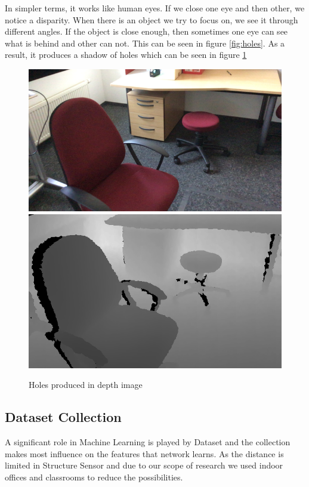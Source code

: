 In simpler terms, it works like human eyes. If we close one eye and then other, we notice a disparity. When there is an object we try to focus on, we see it through different angles. If the object is close enough, then sometimes one eye can see what is behind and other can not. This can be seen in figure \ref{fig:holes}. As a result, it produces a shadow of holes which can be seen in figure \ref{fig:holes2}\\

\begin{figure}[b]
    \includegraphics[scale=0.29]{Figures/RGB.png} \includegraphics[scale=0.37]{Figures/Depth.png}
    \caption{Holes produced in depth image}
    \label{fig:holes2}
\end{figure}


\subsection{Dataset Collection}

A significant role in Machine Learning is played by Dataset and the collection makes most influence on the features that network learns. As the distance is limited in Structure Sensor and due to our scope of research we used indoor offices and classrooms to reduce the possibilities.\\

